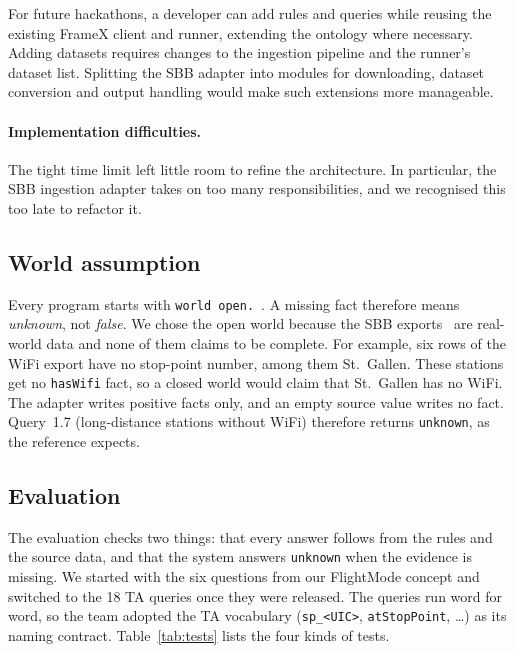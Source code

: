 \documentclass[10pt]{article}
\begin{document}
For future hackathons, a developer can add rules and queries while reusing the existing FrameX client and runner, extending the ontology where necessary. Adding datasets requires changes to the ingestion pipeline and the runner's dataset list. Splitting the SBB adapter into modules for downloading, dataset conversion and output handling would make such extensions more manageable.

\paragraph{Implementation difficulties.}
The tight time limit left little room to refine the architecture. In particular, the SBB ingestion adapter takes on too many responsibilities, and we recognised this too late to refactor it.

\subsection{World assumption}
\label{sec:world}

Every program starts with \texttt{world open.}~\citep{framex}. A missing fact therefore means \emph{unknown}, not \emph{false}. We chose the open world because the SBB exports~\citep{sbbdata} are real-world data and none of them claims to be complete. For example, six rows of the WiFi export have no stop-point number, among them St.~Gallen. These stations get no \texttt{hasWifi} fact, so a closed world would claim that St.~Gallen has no WiFi. The adapter writes positive facts only, and an empty source value writes no fact. Query~1.7 (long-distance stations without WiFi) therefore returns \texttt{unknown}, as the reference expects.

\subsection{Evaluation}
\label{sec:evaluation}

The evaluation checks two things: that every answer follows from the rules and the source data, and that the system answers \texttt{unknown} when the evidence is missing. We started with the six questions from our FlightMode concept and switched to the 18 TA queries once they were released. The queries run word for word, so the team adopted the TA vocabulary (\texttt{sp\_<UIC>}, \texttt{atStopPoint}, \ldots) as its naming contract. Table~\ref{tab:tests} lists the four kinds of tests.
\end{document}
